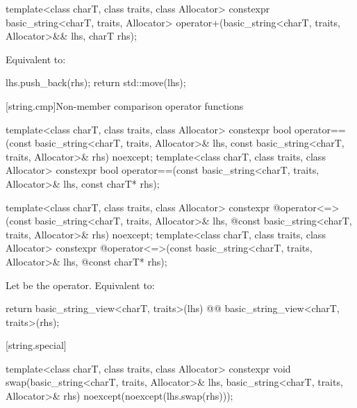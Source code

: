 %
\begin{itemdecl}
template<class charT, class traits, class Allocator>
  constexpr basic_string<charT, traits, Allocator>
    operator+(basic_string<charT, traits, Allocator>&& lhs, charT rhs);
\end{itemdecl}

\begin{itemdescr}
\pnum
\effects
Equivalent to:
\begin{codeblock}
lhs.push_back(rhs);
return std::move(lhs);
\end{codeblock}
\end{itemdescr}

[string.cmp]{Non-member comparison operator functions}
\begin{itemdecl}
template<class charT, class traits, class Allocator>
  constexpr bool
    operator==(const basic_string<charT, traits, Allocator>& lhs,
               const basic_string<charT, traits, Allocator>& rhs) noexcept;
template<class charT, class traits, class Allocator>
  constexpr bool operator==(const basic_string<charT, traits, Allocator>& lhs,
                            const charT* rhs);

template<class charT, class traits, class Allocator>
  constexpr @\seebelow@ operator<=>(const basic_string<charT, traits, Allocator>& lhs,
            @\itcorr@                      const basic_string<charT, traits, Allocator>& rhs) noexcept;
template<class charT, class traits, class Allocator>
  constexpr @\seebelow@ operator<=>(const basic_string<charT, traits, Allocator>& lhs,
            @\itcorr@                      const charT* rhs);
\end{itemdecl}
\begin{itemdescr}
\pnum
\effects
Let  be the operator.
Equivalent to:
\begin{codeblock}
return basic_string_view<charT, traits>(lhs) @@ basic_string_view<charT, traits>(rhs);
\end{codeblock}
\end{itemdescr}

[string.special]{}

%
\begin{itemdecl}
template<class charT, class traits, class Allocator>
  constexpr void
    swap(basic_string<charT, traits, Allocator>& lhs,
         basic_string<charT, traits, Allocator>& rhs)
      noexcept(noexcept(lhs.swap(rhs)));
\end{itemdecl}

